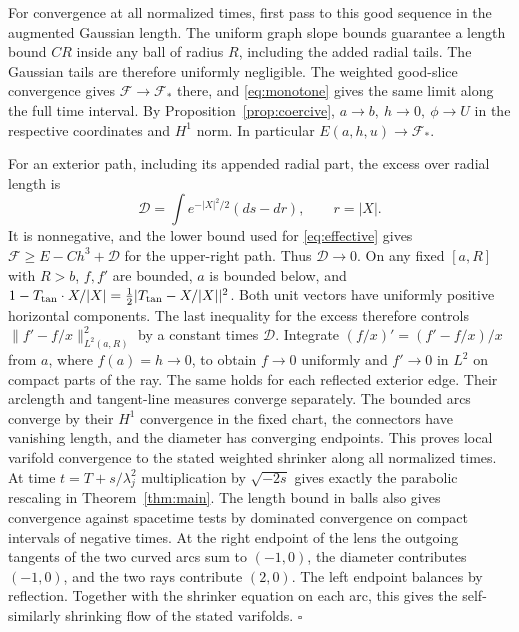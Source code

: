 For convergence at all normalized times, first pass to this good
sequence in the augmented Gaussian length. The uniform graph slope
bounds guarantee a length bound \(CR\) inside any ball of radius
\(R\), including the added radial tails. The Gaussian tails are therefore
uniformly negligible. The weighted good-slice convergence gives
\(\mathcal F\to\mathcal F_*\) there, and \eqref{eq:monotone} gives the
same limit along the full time interval. By Proposition~\ref{prop:coercive},
\(a\to b,\ h\to0,\ \phi\to U\) in the respective coordinates and
\(H^1\) norm. In particular \(E(a,h,u)\to\mathcal F_*\).

For an exterior path, including its appended radial part, the
excess over radial length is
\[
 \mathcal D=\int e^{-|X|^2/2}(ds-dr),\qquad r=|X|.
\]
It is nonnegative, and the lower bound used for \eqref{eq:effective}
gives \(\mathcal F\ge E-Ch^3+\mathcal D\) for the upper-right path.
Thus \(\mathcal D\to0\).
On any fixed \([a,R]\) with \(R>b\), \(f,f'\) are bounded, \(a\)
is bounded below, and \(1-T_{\rm tan}\cdot X/|X|
=\tfrac12|T_{\rm tan}-X/|X||^2\).
Both unit vectors have uniformly positive horizontal components.
The last inequality for the excess therefore controls
\(\|f'-f/x\|_{L^2(a,R)}^2\) by a constant times \(\mathcal D\).
Integrate \((f/x)'=(f'-f/x)/x\) from \(a\), where \(f(a)=h\to0\),
to obtain \(f\to0\) uniformly and \(f'\to0\) in \(L^2\) on compact
parts of the ray. The same holds for each reflected exterior edge.
Their arclength and tangent-line measures converge separately.
The bounded arcs converge by their \(H^1\) convergence in the fixed
chart, the connectors have vanishing length, and the diameter has
converging endpoints. This proves local varifold convergence to the
stated weighted shrinker along all normalized times. At time
\(t=T+s/\lambda_j^2\) multiplication by \(\sqrt{-2s}\) gives
exactly the parabolic rescaling in Theorem~\ref{thm:main}.
The length bound in balls also gives convergence against spacetime
tests by dominated convergence on compact intervals of negative times.
At the right endpoint of the lens the outgoing tangents of the two
curved arcs sum to \((-1,0)\), the diameter contributes \((-1,0)\),
and the two rays contribute \((2,0)\). The left endpoint balances
by reflection. Together with the shrinker equation on each arc, this
gives the self-similarly shrinking flow of the stated varifolds.
\hfill\(\square\)
